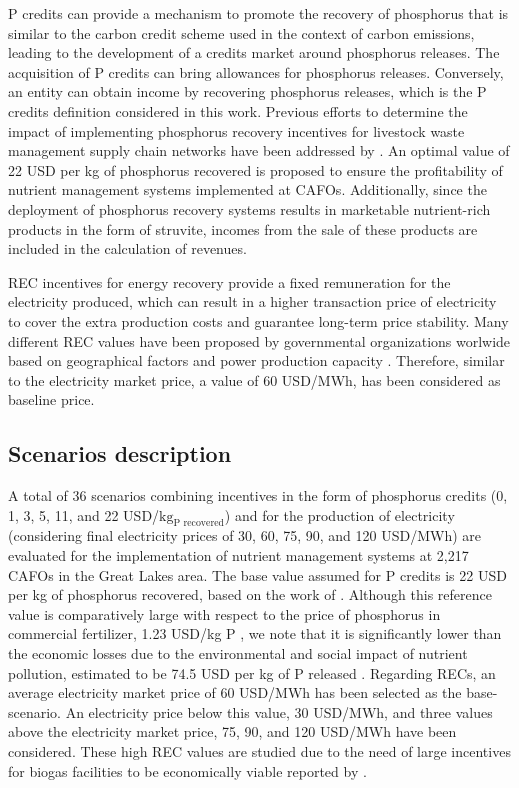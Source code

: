 \begin{refsection}[referencesCh5]
P credits can provide a mechanism to promote the recovery of phosphorus that is similar to the carbon credit scheme used in the context of carbon emissions, leading to the development of a credits market around phosphorus releases. The acquisition of P credits can bring allowances for phosphorus releases. Conversely, an entity can obtain income by recovering phosphorus releases, which is the P credits definition considered in this work. Previous efforts to determine the impact of implementing phosphorus recovery incentives for livestock waste management supply chain networks have been addressed by \citet{sampat_economic_2018}. An optimal value of 22 USD per kg of phosphorus recovered is proposed to ensure the profitability of nutrient management systems implemented at CAFOs. Additionally, since the deployment of phosphorus recovery systems results in marketable nutrient-rich products in the form of struvite, incomes from the sale of these products are included in the calculation of revenues.

REC incentives for energy recovery provide a fixed remuneration for the electricity produced, which can result in a higher transaction price of electricity to cover the extra production costs and guarantee long-term price stability. Many different REC values have been proposed by governmental organizations worlwide based on geographical factors and power production capacity \citep{Deremince}. Therefore, similar to the electricity market price, a value of 60 USD/MWh, has been considered as baseline price.

\subsection{Scenarios description}
A total of 36 scenarios combining incentives in the form of phosphorus credits (0, 1, 3, 5, 11, and 22 USD/${\text{kg}_\text{P recovered}}$) and for the production of electricity (considering final electricity prices of 30, 60, 75, 90, and 120 USD/MWh) are evaluated for the implementation of nutrient management systems at 2,217 CAFOs in the Great Lakes area. The base value assumed for P credits is 22 USD per kg of phosphorus recovered, based on the work of \citet{sampat_economic_2018}. Although this reference value is comparatively large with respect to the price of phosphorus in commercial fertilizer, 1.23 USD/kg P \citep{fertilizers_price}, we note that it is significantly lower than the economic losses due to the environmental and social impact of nutrient pollution, estimated to be 74.5 USD per kg of P released \citep{Sampat2020}. Regarding RECs, an average electricity market price of 60 USD/MWh has been selected as the base-scenario. An electricity price below this value, 30 USD/MWh, and three values above the electricity market price, 75, 90, and 120 USD/MWh have been considered. These high REC values are studied due to the need of large incentives for biogas facilities to be economically viable reported by \citet{sampat_economic_2018}.


\end{refsection}
